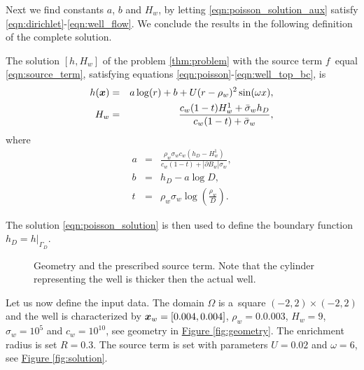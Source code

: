 \documentclass[FM,Dis]{tulthesis}
\newcommand{\fig}[1]{\hyperref[#1]{Figure \ref{#1}}}
\newcommand{\results}{results/}
\begin{document}
Next we find constants $a$, $b$ and $H_w$, by letting \eqref{eqn:poisson_solution_aux} satisfy \eqref{eqn:dirichlet}-\eqref{eqn:well_flow}.
We conclude the results in the following definition of the complete solution.
\begin{definition} \label{def:solution}
The solution $[h,H_w]$ of the problem \ref{thm:problem}
with the source term $f$~equal \eqref{eqn:source_term},
satisfying equations \eqref{eqn:poisson}-\eqref{eqn:well_top_bc}, is
\begin{eqnarray}
  h(\mathbf{\boldsymbol{x}}) &=& a\log(r) + b + U(r-\rho_w)^2 \sin(\omega x), \label{eqn:poisson_solution}\\
  H_w &=& \frac{c_w(1-t) H^1_w + \bar{\sigma}_w h_D}{c_w(1-t) + \bar{\sigma}_w}, \label{eqn:well_solution}
\end{eqnarray}
where
\begin{eqnarray}
  a &=& \frac{\rho_w\sigma_w c_w (h_D-H^1_w)}{c_w(1-t) + |\partial B_w|\sigma_w}, \nonumber \\
  b &=& h_D - a\log D, \nonumber \\
  t &=& \rho_w\sigma_w\log\left(\frac{\rho_w}{D}\right). \nonumber
\end{eqnarray}
\end{definition}

The solution \eqref{eqn:poisson_solution} is then used to define the boundary function $h_D = h|_{\Gamma_D}$.

\begin{figure}[!htb]
  \centering    
  \hspace{5pt}
  \caption[]
  {Geometry and the prescribed source term. Note that the cylinder representing the well is thicker then the actual well.}
\end{figure}

Let us now define the input data. The domain $\Omega$ is a~square $(-2,2)\times(-2,2)$ and the well is characterized by 
$\mathbf{\boldsymbol{x}}_w=[0.004,0.004]$,  $\rho_w=0.0.003$, $H_w=9$, $\sigma_w=10^5$ and $c_w=10^{10}$, see geometry in \fig{fig:geometry}. 
The enrichment radius is set $R=0.3$.
The source term is set with parameters $U=0.02$ and $\omega=6$, see \fig{fig:solution}.
\end{document}
